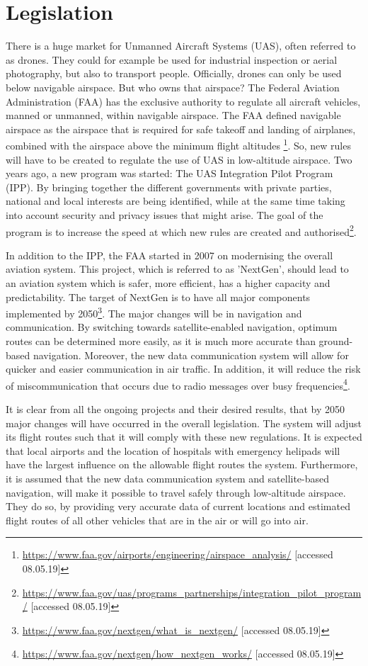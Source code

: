\section{Legislation}
\label{legislation}
There is a huge market for Unmanned Aircraft Systems (UAS), often referred to as drones. They could for example be used for industrial inspection or aerial photography, but also to transport people. Officially, drones can only be used below navigable airspace. But who owns that airspace? The Federal Aviation Administration (FAA) has the exclusive authority to regulate all aircraft vehicles, manned or unmanned, within navigable airspace. The FAA defined navigable airspace as the airspace that is required for safe takeoff and landing of airplanes, combined with the airspace above the minimum flight altitudes \footnote{\url{https://www.faa.gov/airports/engineering/airspace_analysis/} [accessed 08.05.19]}. So, new rules will have to be created to regulate the use of UAS in low-altitude airspace. Two years ago, a new program was started: The UAS Integration Pilot Program (IPP). By bringing together the different governments with private parties, national and local interests are being identified, while at the same time taking into account security and privacy issues that might arise. The goal of the program is to increase the speed at which new rules are created and authorised\footnote{\url{https://www.faa.gov/uas/programs_partnerships/integration_pilot_program/} [accessed 08.05.19]}.

In addition to the IPP, the FAA started in 2007 on modernising the overall aviation system. This project, which is referred to as 'NextGen', should lead to an aviation system which is safer, more efficient, has a higher capacity and predictability. The target of NextGen is to have all major components implemented by 2050\footnote{\url{https://www.faa.gov/nextgen/what_is_nextgen/} [accessed 08.05.19]}. The major changes will be in navigation and communication. By switching towards satellite-enabled navigation, optimum routes can be determined more easily, as it is much more accurate than ground-based navigation. Moreover, the new data communication system will allow for quicker and easier communication in air traffic. In addition, it will reduce the risk of miscommunication that occurs due to radio messages over busy frequencies\footnote{\url{https://www.faa.gov/nextgen/how_nextgen_works/} [accessed 08.05.19]}.

It is clear from all the ongoing projects and their desired results, that by 2050 major changes will have occurred in the overall legislation. The system will adjust its flight routes such that it will comply with these new regulations. It is expected that local airports and the location of hospitals with emergency helipads will have the largest influence on the allowable flight routes the system. Furthermore, it is assumed that the new data communication system and satellite-based navigation, will make it possible to travel safely through low-altitude airspace. They do so, by providing very accurate data of current locations and estimated flight routes of all other vehicles that are in the air or will go into air. 


